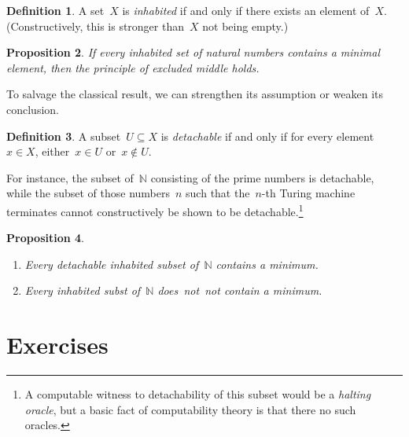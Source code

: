 \documentclass[10pt,reqno,a4paper,openany]{amsbook}
\theoremstyle{definition}
\newtheorem{defn}{Definition}[chapter]
\theoremstyle{plain}
\newtheorem{prop}[defn]{Proposition}
\theoremstyle{remark}
\newcommand{\NN}{\mathbb{N}}
\newcommand{\?}{\,{:}\,}
\renewcommand{\_}{\mathpunct{.}\,}
\newcommand{\notnot}{\emph{not~not}\xspace}
\begin{document}
\begin{defn}A set~$X$ is \emph{inhabited} if and only if there exists an
element of~$X$. (Constructively, this is stronger than~$X$ not being
empty.)\end{defn}

\begin{prop}If every inhabited set of natural numbers contains a minimal
element, then the principle of excluded middle holds.\end{prop}

To salvage the classical result, we can strengthen its assumption or weaken its
conclusion.

\begin{defn}A subset~$U \subseteq X$ is \emph{detachable} if and only if for
every element~$x \in X$, either~$x \in U$ or~$x \not\in U$.\end{defn}

For instance, the subset of~$\NN$ consisting of the prime numbers is detachable,
while the subset of those numbers~$n$ such that the~$n$-th Turing machine
terminates cannot constructively be shown to be detachable.\footnote{A
computable witness to detachability of this subset would be a \emph{halting
oracle}, but a basic fact of computability theory is that there no such
oracles.}

\begin{prop}\label{prop:minima}\begin{enumerate}
\item Every detachable inhabited subset of~$\NN$ contains a minimum.
\item Every inhabited subst of~$\NN$ does~\notnot contain a minimum.
\end{enumerate}
\end{prop}


\section{Exercises}
\end{document}
